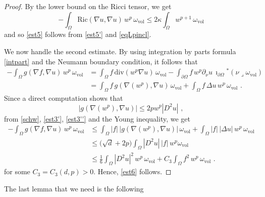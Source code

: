 \documentclass[10pt, a4paper, reqno, oneside]{amsart}
\theoremstyle{plain}
\theoremstyle{definition}
\theoremstyle{plain}
\theoremstyle{definition}
\theoremstyle{plain}
\renewcommand{\=}{:=}
\begin{document}
\begin{proof}
By the lower bound on the Ricci tensor, we get
\begin{equation} \label{est5'}
-\int_\Omega \mathrm{Ric}(\nabla u,\nabla u)\,w^p\,\omega_{\mathrm{vol}} \leq 2\kappa \int_\Omega w^{p+1}\,\omega_{\mathrm{vol}}
\end{equation}
and so \eqref{est5} follows from \eqref{est5'} and \eqref{eqLpincl}.

We now handle the second estimate. By using integration by parts formula \eqref{intpart} and the Neumann boundary condition, it follows that
\begin{equation} \label{est3'} \begin{aligned}
-\int_\Omega g(\nabla f,\nabla u)\,w^p\,\omega_{\mathrm{vol}} &= \int_\Omega f\, \mathrm{div}(w^p\nabla u)\,\omega_{\mathrm{vol}}-\int_{\partial\Omega} f\,w^p\partial_\nu u\,\imath_{\partial\Omega}{}^*(\nu \lrcorner \omega_{\mathrm{vol}}) \\
&= \int_\Omega f\,g(\nabla(w^p), \nabla u)\,\omega_{\mathrm{vol}} +\int_\Omega f\,\Delta u\,w^p\,\omega_{\mathrm{vol}} \,\, .
\end{aligned} \end{equation}
Since a direct computation shows that
\begin{equation} \label{est3''}
\big|g(\nabla (w^p), \nabla u)\big| \leq 2p w^p |D^2u| \,\, ,
\end{equation}
from \eqref{schw}, \eqref{est3'}, \eqref{est3''} and the Young inequality, we get
$$\begin{aligned}
-\int_\Omega g(\nabla f,\nabla u)\,w^p\,\omega_{\mathrm{vol}} &\leq
\int_\Omega |f|\,\big|g(\nabla (w^p), \nabla u)\big|\,\omega_{\mathrm{vol}} +\int_\Omega |f|\,|\Delta u|\,w^p\,\omega_{\mathrm{vol}} \\
&\leq \big(\sqrt{d}+2p\big)\int_\Omega |D^2u|\,|f|\,w^p \omega_{\mathrm{vol}} \\
&\leq \tfrac16\int_\Omega |D^2u|^2\,w^p\,\omega_{\mathrm{vol}} +C_3 \int_\Omega f^2\,w^p\,\omega_{\mathrm{vol}} \,\, .
\end{aligned}$$
for some $C_3=C_3(d,p)>0$. Hence, \eqref{est6} follows.
\end{proof}

The last lemma that we need is the following
\end{document}
